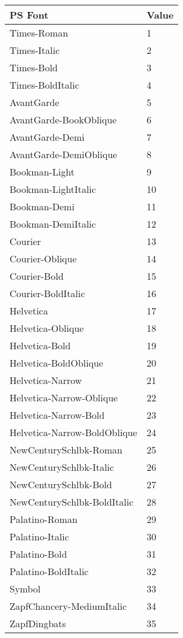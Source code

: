 \begin{center}
\begin{tabular}{|l|l|}
\hline
PS Font				& Value		\\ \hline
\hline
Times-Roman			& 1		\\ \hline
Times-Italic			& 2		\\ \hline
Times-Bold			& 3		\\ \hline
Times-BoldItalic		& 4		\\ \hline
AvantGarde			& 5		\\ \hline
AvantGarde-BookOblique		& 6		\\ \hline
AvantGarde-Demi			& 7		\\ \hline
AvantGarde-DemiOblique		& 8		\\ \hline
Bookman-Light			& 9		\\ \hline
Bookman-LightItalic		& 10		\\ \hline
Bookman-Demi			& 11		\\ \hline
Bookman-DemiItalic		& 12		\\ \hline
Courier				& 13		\\ \hline
Courier-Oblique			& 14		\\ \hline
Courier-Bold			& 15		\\ \hline
Courier-BoldItalic		& 16		\\ \hline
Helvetica			& 17		\\ \hline
Helvetica-Oblique		& 18		\\ \hline
Helvetica-Bold			& 19		\\ \hline
Helvetica-BoldOblique		& 20		\\ \hline
Helvetica-Narrow		& 21		\\ \hline
Helvetica-Narrow-Oblique	& 22		\\ \hline
Helvetica-Narrow-Bold		& 23		\\ \hline
Helvetica-Narrow-BoldOblique	& 24		\\ \hline
NewCenturySchlbk-Roman		& 25		\\ \hline
NewCenturySchlbk-Italic		& 26		\\ \hline
NewCenturySchlbk-Bold		& 27		\\ \hline
NewCenturySchlbk-BoldItalic	& 28		\\ \hline
Palatino-Roman			& 29		\\ \hline
Palatino-Italic			& 30		\\ \hline
Palatino-Bold			& 31		\\ \hline
Palatino-BoldItalic		& 32		\\ \hline
Symbol				& 33		\\ \hline
ZapfChancery-MediumItalic	& 34		\\ \hline
ZapfDingbats			& 35		\\ \hline
\end{tabular}
\end{center}

